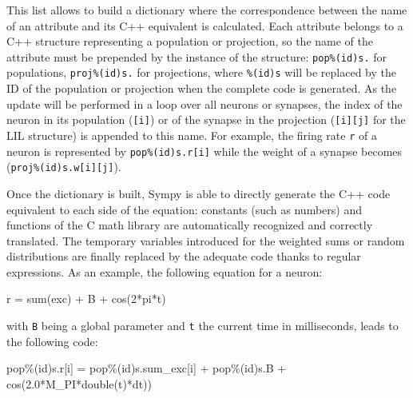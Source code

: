 \documentclass[
  11pt,
  a4paper,
]{scrbook}
\newenvironment{Shaded}{}{}
\newcommand{\BuiltInTok}[1]{\textcolor[rgb]{0.84,0.23,0.29}{#1}}
\newcommand{\DataTypeTok}[1]{\textcolor[rgb]{0.84,0.23,0.29}{#1}}
\newcommand{\DecValTok}[1]{\textcolor[rgb]{0.00,0.36,0.77}{#1}}
\newcommand{\FloatTok}[1]{\textcolor[rgb]{0.00,0.36,0.77}{#1}}
\newcommand{\NormalTok}[1]{\textcolor[rgb]{0.14,0.16,0.18}{#1}}
\newcommand{\OperatorTok}[1]{\textcolor[rgb]{0.14,0.16,0.18}{#1}}
\begin{document}
This list allows to build a dictionary where the correspondence between
the name of an attribute and its C++ equivalent is calculated. Each
attribute belongs to a C++ structure representing a population or
projection, so the name of the attribute must be prepended by the
instance of the structure: \texttt{pop\%(id)s.} for populations,
\texttt{proj\%(id)s.} for projections, where \texttt{\%(id)s} will be
replaced by the ID of the population or projection when the complete
code is generated. As the update will be performed in a loop over all
neurons or synapses, the index of the neuron in its population
(\texttt{{[}i{]}}) or of the synapse in the projection
(\texttt{{[}i{]}{[}j{]}} for the LIL structure) is appended to this
name. For example, the firing rate \texttt{r} of a neuron is represented
by \texttt{pop\%(id)s.r{[}i{]}} while the weight of a synapse becomes
(\texttt{proj\%(id)s.w{[}i{]}{[}j{]}}).

Once the dictionary is built, Sympy is able to directly generate the C++
code equivalent to each side of the equation: constants (such as
numbers) and functions of the C math library are automatically
recognized and correctly translated. The temporary variables introduced
for the weighted sums or random distributions are finally replaced by
the adequate code thanks to regular expressions. As an example, the
following equation for a neuron:

\begin{Shaded}
\begin{Highlighting}[]
\NormalTok{r }\OperatorTok{=} \BuiltInTok{sum}\NormalTok{(exc) }\OperatorTok{+}\NormalTok{ B }\OperatorTok{+}\NormalTok{ cos(}\DecValTok{2}\OperatorTok{*}\NormalTok{pi}\OperatorTok{*}\NormalTok{t)}
\end{Highlighting}
\end{Shaded}

with \texttt{B} being a global parameter and \texttt{t} the current time
in milliseconds, leads to the following code:

\begin{Shaded}
\begin{Highlighting}[]
\NormalTok{pop}\OperatorTok{\%(}\NormalTok{id}\OperatorTok{)}\NormalTok{s}\OperatorTok{.}\NormalTok{r}\OperatorTok{[}\NormalTok{i}\OperatorTok{]} \OperatorTok{=}\NormalTok{ pop}\OperatorTok{\%(}\NormalTok{id}\OperatorTok{)}\NormalTok{s}\OperatorTok{.}\NormalTok{sum\_exc}\OperatorTok{[}\NormalTok{i}\OperatorTok{]} \OperatorTok{+}\NormalTok{ pop}\OperatorTok{\%(}\NormalTok{id}\OperatorTok{)}\NormalTok{s}\OperatorTok{.}\NormalTok{B }\OperatorTok{+}\NormalTok{ cos}\OperatorTok{(}\FloatTok{2.0}\OperatorTok{*}\NormalTok{M\_PI}\OperatorTok{*}\DataTypeTok{double}\OperatorTok{(}\NormalTok{t}\OperatorTok{)*}\NormalTok{dt}\OperatorTok{))}
\end{Highlighting}
\end{Shaded}
\end{document}
